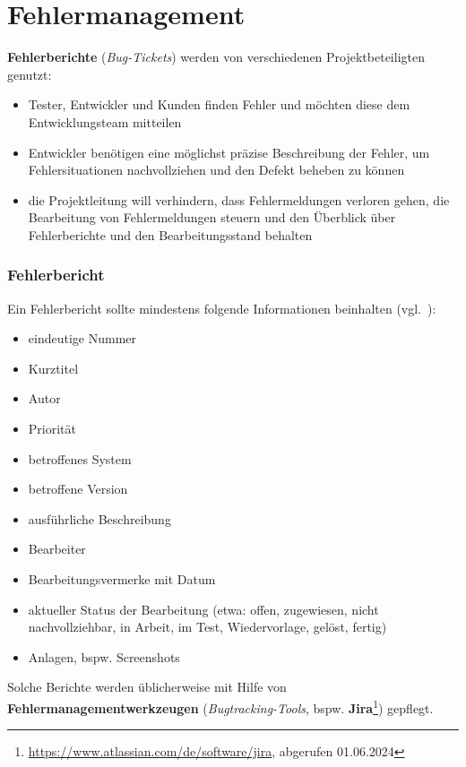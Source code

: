 \section{Fehlermanagement}
\textbf{Fehlerberichte} (\textit{Bug-Tickets}) werden von verschiedenen Projektbeteiligten genutzt:

\begin{itemize}
    \item Tester, Entwickler und Kunden finden Fehler und  möchten diese dem Entwicklungsteam mitteilen
    \item Entwickler benötigen eine möglichst präzise Beschreibung der Fehler, um Fehlersituationen nachvollziehen und den Defekt beheben zu können
    \item die Projektleitung will verhindern, dass Fehlermeldungen verloren gehen, die Bearbeitung von Fehlermeldungen steuern und den Überblick über Fehlerberichte und den Bearbeitungsstand behalten
\end{itemize}

\subsubsection*{Fehlerbericht}

Ein Fehlerbericht sollte mindestens folgende Informationen beinhalten (vgl.~\cite[75]{Wed09c}):

\begin{itemize}
    \item eindeutige Nummer
    \item Kurztitel
    \item Autor
    \item Priorität
    \item betroffenes System
    \item betroffene Version
    \item ausführliche Beschreibung
    \item Bearbeiter
    \item Bearbeitungsvermerke mit Datum
    \item aktueller Status der Bearbeitung (etwa: offen, zugewiesen, nicht nachvollziehbar, in Arbeit, im Test, Wiedervorlage, gelöst, fertig)
    \item Anlagen, bspw. Screenshots
\end{itemize}

\noindent
Solche Berichte werden üblicherweise mit Hilfe von \textbf{Fehlermanagementwerkzeugen} (\textit{Bugtracking-Tools}, bspw. \textbf{Jira}\footnote{
\url{https://www.atlassian.com/de/software/jira}, abgerufen 01.06.2024
}) gepflegt.

